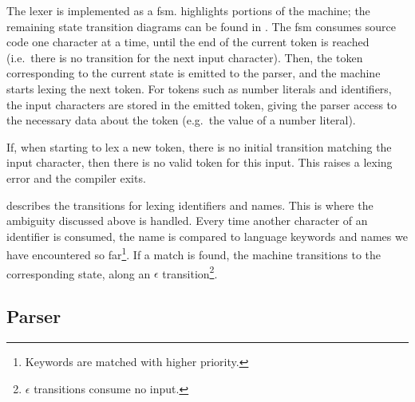 \documentclass[00-main.tex]{subfiles}
\begin{document}
The lexer is implemented as a \gls{fsm}.  highlights portions of the machine; the remaining state transition diagrams can be found in .
The \gls{fsm} consumes source code one character at a time, until the end of the current token is reached (i.e.\ there is no transition for the next input character).
Then, the token corresponding to the current state is emitted to the parser, and the machine starts lexing the next token.
For tokens such as number literals and identifiers, the input characters are stored in the emitted token, giving the parser access to the necessary data about the token (e.g.~the value of a number literal).

If, when starting to lex a new token, there is no initial transition matching the input character, then there is no valid token for this input. This raises a lexing error and the compiler exits.


 describes the transitions for lexing identifiers and  names.
This is where the ambiguity discussed above is handled.
  Every time another character of an identifier is consumed, the name is compared to language keywords and  names we have encountered so far\footnote{Keywords are matched with higher priority.}.
  If a match is found, the machine transitions to the corresponding state, along an $\epsilon$ transition\footnote{$\epsilon$ transitions consume no input.}.


\subsection{Parser}
\end{document}
